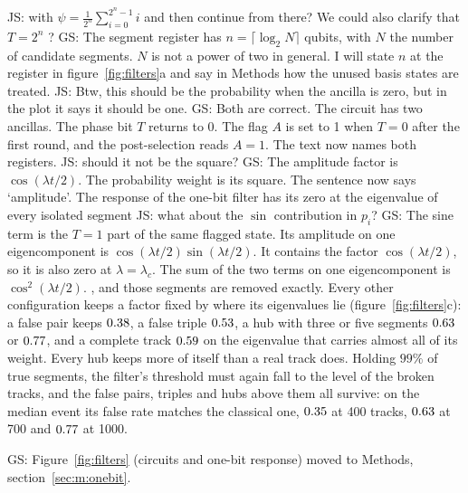 \documentclass[11pt,a4paper]{article}
\newcommand{\js}[1]{{\color{blue} JS: #1 }}
\newcommand{\gs}[1]{{\color{orange!85!black} GS: #1 }}
\newcommand{\gss}[1]{{\color{teal} #1}}
\begin{document}
\js{with $\psi = \frac 1 {2^n} \sum_{i=0}^{2^n-1} i$ and then continue from there? We could also clarify that $T = 2^n$ ?} \gs{The segment register has $n=\lceil\log_2 N\rceil$ qubits, with $N$ the number of candidate segments. $N$ is not a power of two in general. I will state $n$ at the register in figure~\ref{fig:filters}a and say in Methods how the unused basis states are treated.}
\js{Btw, this should be the probability when the ancilla is zero, but in the plot it says it should be one.} \gs{Both are correct. The circuit has two ancillas. The phase bit $T$ returns to 0. The flag $A$ is set to 1 when $T=0$ after the first round, and the post-selection reads $A=1$. The text now names both registers.}
 \js{should it not be the square?} \gs{The amplitude factor is $\cos(\lambda t/2)$. The probability weight is its square. The sentence now says `amplitude'.} \gss{The response of the one-bit filter has its zero at} the eigenvalue of every isolated segment \js{what about the $\sin$ contribution in $p_i$?} \gs{The sine term is the $T=1$ part of the same flagged state. Its amplitude on one eigencomponent is $\cos(\lambda t/2)\sin(\lambda t/2)$. It contains the factor $\cos(\lambda t/2)$, so it is also zero at $\lambda=\lambda_c$. The sum of the two terms on one eigencomponent is $\cos^2(\lambda t/2)$.}, and those segments are removed
exactly. Every other configuration keeps a factor fixed by where its eigenvalues lie
(figure~\ref{fig:filters}c): a false pair keeps $0.38$, a false triple $0.53$, a
hub with three or five segments $0.63$ or $0.77$, and a complete track
$0.59$ on the eigenvalue that carries almost all of its weight. Every hub keeps more of
itself than a real track does. Holding $99\%$ of true segments, the filter's threshold must again fall to the level of the
broken tracks, and the false pairs, triples and hubs above them all survive: on the median event its
false rate matches the classical one, $0.35$ at 400 tracks,
$0.63$ at 700 and $0.77$ at 1000.

\gs{Figure~\mbox{\ref{fig:filters}} (circuits and one-bit response) moved to Methods, section~\mbox{\ref{sec:m:onebit}}.}
\end{document}
